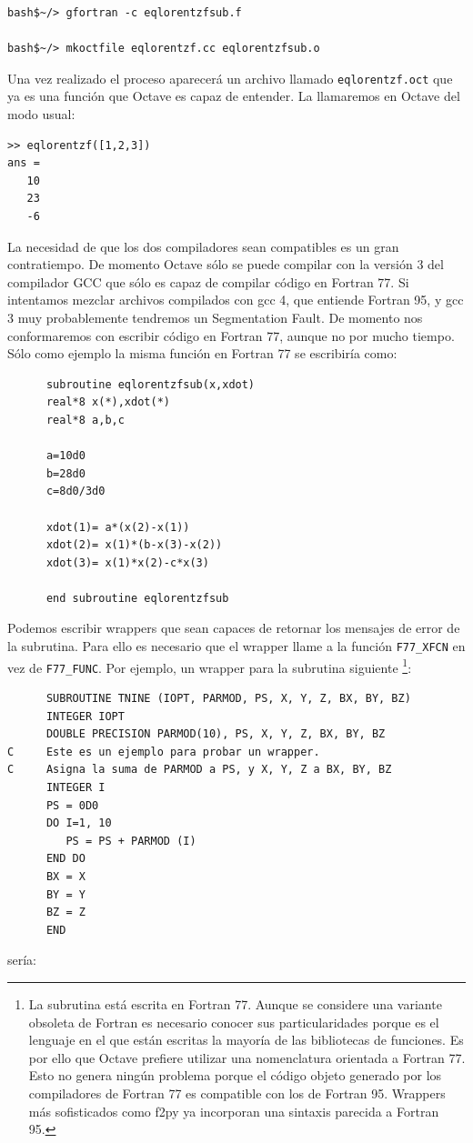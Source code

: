   \begin{verbatim}
bash$~/> gfortran -c eqlorentzfsub.f

bash$~/> mkoctfile eqlorentzf.cc eqlorentzfsub.o
\end{verbatim}
Una vez realizado el proceso aparecerá un archivo llamado
\texttt{eqlorentzf.oct} que ya es una función que Octave es capaz de
entender. La llamaremos en Octave del modo usual:

\begin{verbatim}
>> eqlorentzf([1,2,3])
ans =
   10
   23
   -6
\end{verbatim}
La necesidad de que los dos compiladores sean compatibles es un gran
contratiempo. De momento Octave sólo se puede compilar con la versión
3 del compilador GCC que sólo es capaz de compilar código en Fortran
77. Si intentamos mezclar archivos compilados con gcc 4, que entiende
Fortran 95, y gcc 3 muy probablemente tendremos un Segmentation Fault.
De momento nos conformaremos con escribir código en Fortran 77, aunque
no por mucho tiempo. Sólo como ejemplo la misma función en Fortran 77
se escribiría como:

\begin{verbatim}
      subroutine eqlorentzfsub(x,xdot)
      real*8 x(*),xdot(*)
      real*8 a,b,c

      a=10d0
      b=28d0
      c=8d0/3d0

      xdot(1)= a*(x(2)-x(1))
      xdot(2)= x(1)*(b-x(3)-x(2))
      xdot(3)= x(1)*x(2)-c*x(3)

      end subroutine eqlorentzfsub
\end{verbatim}
Podemos escribir wrappers que sean capaces de retornar los mensajes de
error de la subrutina. Para ello es necesario que el wrapper llame a
la función \texttt{F77\_XFCN} en vez de \texttt{F77\_FUNC}. Por
ejemplo, un wrapper para la subrutina siguiente%
\footnote{La subrutina está escrita en Fortran 77. Aunque se considere
  una variante obsoleta de Fortran es necesario conocer sus
  particularidades porque es el lenguaje en el que están escritas la
  mayoría de las bibliotecas de funciones. Es por ello que Octave
  prefiere utilizar una nomenclatura orientada a Fortran 77. Esto no
  genera ningún problema porque el código objeto generado por los
  compiladores de Fortran 77 es compatible con los de Fortran 95.
  Wrappers más sofisticados como f2py ya incorporan una sintaxis
  parecida a Fortran 95.%
}:
\begin{verbatim}
      SUBROUTINE TNINE (IOPT, PARMOD, PS, X, Y, Z, BX, BY, BZ)
      INTEGER IOPT
      DOUBLE PRECISION PARMOD(10), PS, X, Y, Z, BX, BY, BZ    
C     Este es un ejemplo para probar un wrapper.
C     Asigna la suma de PARMOD a PS, y X, Y, Z a BX, BY, BZ
      INTEGER I
      PS = 0D0
      DO I=1, 10
         PS = PS + PARMOD (I)
      END DO
      BX = X
      BY = Y
      BZ = Z
      END
\end{verbatim}
sería:


